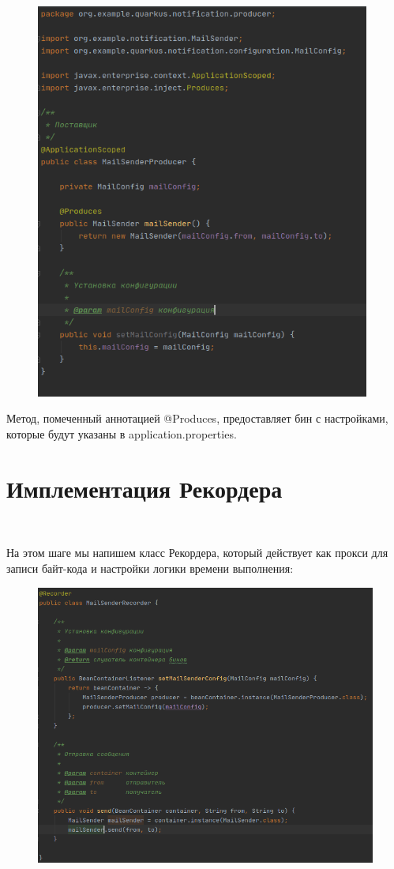 \documentclass[russian,11pt]{article}
\begin{document}
\begin{figure}[H]
	\centering
	\includegraphics[scale=0.5, width=11cm]{7}
\end{figure}
	
	Метод, помеченный аннотацией @Produces, предоставляет бин с настройками, которые будут указаны в application.properties.

\section{Имплементация Рекордера}
~

На этом шаге мы напишем класс Рекордера, который действует как прокси для записи байт-кода и настройки логики времени выполнения:

\begin{figure}[H]
	\centering
	\includegraphics[width=13cm]{8}
\end{figure}
~
\end{document}
